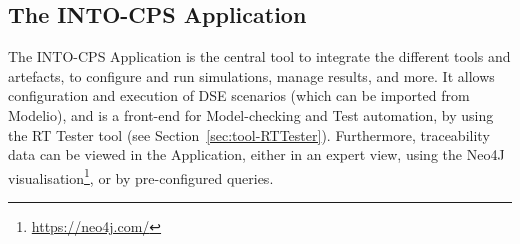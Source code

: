 \subsection{The INTO-CPS Application}

The INTO-CPS Application is the central tool to integrate the different tools and artefacts, to configure and run simulations, manage results, and more. It allows configuration and execution of DSE scenarios (which can be imported from Modelio), and is a front-end for Model-checking and Test automation, by using the RT Tester tool (see Section~\ref{sec:tool-RTTester}). Furthermore, traceability data can be viewed in the Application, either in an expert view, using the Neo4J visualisation\footnote{\url{https://neo4j.com/}}, or by pre-configured queries. 